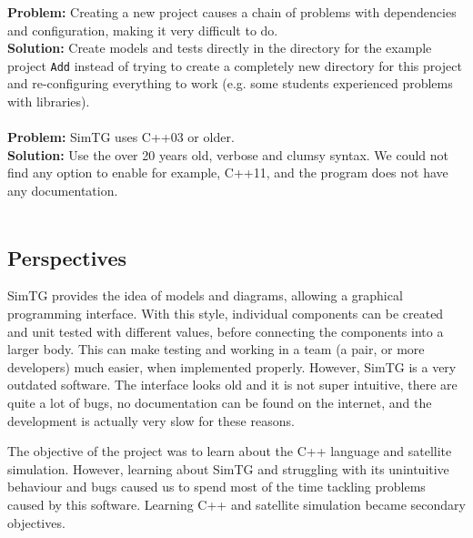 \textbf{Problem:} Creating a new project causes a chain of problems with dependencies and configuration, making it very difficult to do.\\
\textbf{Solution:} Create models and tests directly in the directory for the example project \texttt{Add} instead of trying to create a completely new directory for this project and re-configuring everything to work (e.g. some students experienced problems with libraries).\\\\
\textbf{Problem:} SimTG uses C++03 or older.\\
\textbf{Solution:} Use the over 20 years old, verbose and clumsy syntax. We could not find any option to enable for example, C++11, and the program does not have any documentation.\\\\

\subsection{Perspectives}
SimTG provides the idea of models and diagrams, allowing a graphical programming interface. With this style, individual components can be created and unit tested with different values, before connecting the components into a larger body. This can make testing and working in a team (a pair, or more developers) much easier, when implemented properly. However, SimTG is a very outdated software. The interface looks old and it is not super intuitive, there are quite a lot of bugs, no documentation can be found on the internet, and the development is actually very slow for these reasons.

The objective of the project was to learn about the C++ language and satellite simulation. However, learning about SimTG and struggling with its unintuitive behaviour and bugs caused us to spend most of the time tackling problems caused by this software. Learning C++ and satellite simulation became secondary objectives.

